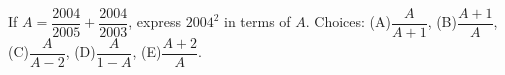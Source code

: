 If $A=\dfrac{2004}{2005}+\dfrac{2004}{2003}$, express $2004^2$ in terms of $A$. Choices: (A)$\dfrac{A}{A+1}$, (B)$\dfrac{A+1}{A}$, (C)$\dfrac{A}{A-2}$, (D)$\dfrac{A}{1-A}$, (E)$\dfrac{A+2}{A}$.
